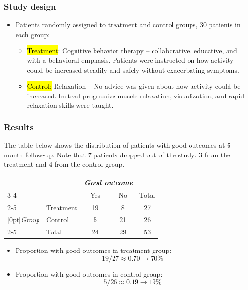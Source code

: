 \documentclass[11pt,containsverbatim,handout]{beamer}
\begin{document}

\begin{frame}
\frametitle{Study design}

\begin{itemize}

\item Patients randomly assigned to treatment and control groups, 30 patients in each group:
\begin{itemize}
\item \hl{Treatment}: Cognitive behavior therapy -- collaborative, educative, and with a behavioral emphasis. Patients were instructed on how activity could be increased steadily and safely without exacerbating symptoms.
\item \hl{Control:} Relaxation -- No advice was given about how activity could be increased. Instead progressive muscle relaxation, visualization, and rapid relaxation skills were taught.
\end{itemize}

\end{itemize}

\end{frame}


\begin{frame}
\frametitle{Results}

The table below shows the distribution of patients with good outcomes at 6-month follow-up. Note that 7 patients dropped out of the study: 3 from the treatment and 4 from the control group.

\begin{center}
\begin{tabular}{ll  cc c} 
			&				& \multicolumn{2}{c}{\textit{Good outcome}} \\
\cline{3-4}
			&							& Yes 	& No 	& Total	\\
\cline{2-5}
							&Treatment 	& 19	 	& 8		& 27 	\\
\raisebox{1.5ex}[0pt]{\textit{Group}}	&Control		& 5	 	& 21	 	& 26 \\
\cline{2-5}
							&Total		& 24		& 29		& 53
\end{tabular}
\end{center}

\pause

\begin{itemize}

\item Proportion with good outcomes in treatment group:
\[ 19 / 27 \approx 0.70 \rightarrow 70\% \]

\pause

\item Proportion with good outcomes in control group:
\[ 5 / 26 \approx 0.19 \rightarrow 19\% \]

\end{itemize}

\end{frame}
\end{document}

